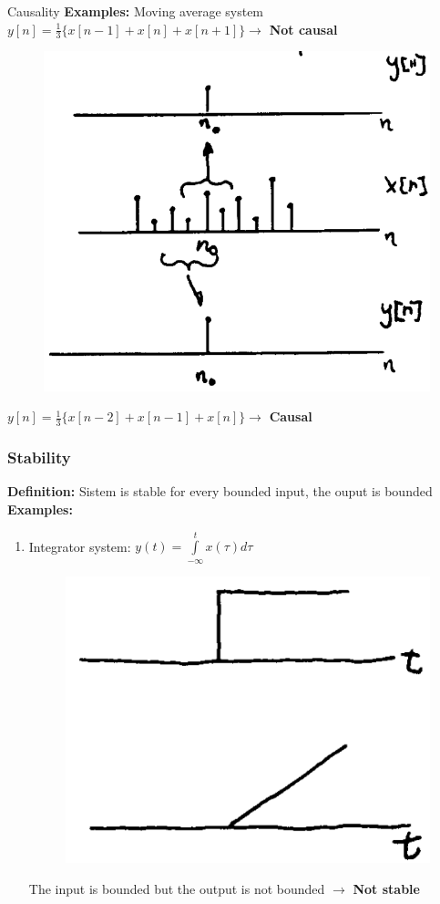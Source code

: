 \documentclass[pdflatex,compress,mathserif]{beamer}
\begin{document}
\begin{frame}{Causality}
	\textbf{Examples:} Moving average system\\
	$ y[n] = \frac{1}{3}\{ x[n-1] + x[n] + x[n+1] \} \longrightarrow$ \textbf{Not causal}
	\begin{figure}
		\centering
		\includegraphics[height=0.5\textheight]{img/img02}
	\end{figure}
	$ y[n] = \frac{1}{3}\{ x[n-2] + x[n-1] + x[n] \} \longrightarrow $ \textbf{Causal}
\end{frame}

\begin{frame}
	\frametitle{Stability}
	\textbf{Definition:} Sistem is stable for every bounded input, the ouput is bounded
	\textbf{Examples:}
	\begin{enumerate}
		\item Integrator system: $ y(t) = \int\limits_{-\infty}^{t} x(\tau) d\tau $
		\begin{figure}
			\centering
			\includegraphics[height=0.3\textheight]{img/img03}
		\end{figure}
		The input is bounded but the output is not bounded $\longrightarrow$ \textbf{Not stable}
	\end{enumerate}
\end{frame}
\end{document}
